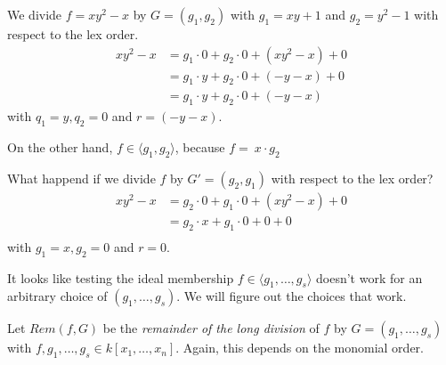 \begin{example}[title = Example 2.2.3]
    We divide $f = xy^2 - x$ by $G = (g_1, g_2)$ with $g_1 = xy + 1$ and $g_2 = y^2 -1$ with respect to the lex order. 
    \begin{align*} 
        xy^2 - x & = g_1 \cdot 0 + g_2 \cdot 0 + (xy^2 - x) + 0 \\
                & = g_1 \cdot y + g_2 \cdot 0 + (-y - x) + 0 \\ 
                & = g_1 \cdot y + g_2 \cdot 0 + (-y -x) 
    \end{align*}
    with $q_1 = y, q_2 = 0$ and $r = (-y-x)$. 

    On the other hand, $f \in \langle g_1, g_2 \rangle$, because $f = \ x \cdot g_2$  
\end{example} 
\begin{example}[title = Example 2.2.4 continued]

    What happend if we divide $f$ by $G' = (g_2, g_1)$ with respect to the lex order? 
    \begin{align*}
            xy^2 - x & = g_2 \cdot 0 + g_1 \cdot 0 + (xy^2 - x) + 0 \\ 
                    &= g_2 \cdot x + g_1 \cdot 0 + 0 + 0 \\
    \end{align*} 
    with $g_1 = x, g_2 = 0$ and $r = 0$.

\end{example}  

It looks like testing the ideal membership $f \in \langle g_1, \ldots, g_s \rangle$ doesn't work for an arbitrary choice of $(g_1, \ldots, g_s)$. 
We will figure out the choices that work. 

\begin{definition}[title = Definition 2.2.4]
   Let $Rem(f, G)$ be the \textit{remainder of the long division} of $f$ by $G = (g_1, \ldots, g_s)$ with $f, g_1, \ldots, g_s \in k[x_1, \dots, x_n]$. 
   Again, this depends on the monomial order.
\end{definition} 

